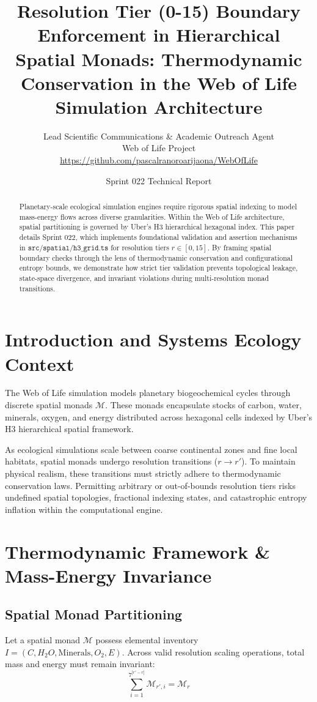 \documentclass[11pt, a4paper]{article}
\title{\textbf{Resolution Tier (0-15) Boundary Enforcement in Hierarchical Spatial Monads: Thermodynamic Conservation in the Web of Life Simulation Architecture}}
\author{Lead Scientific Communications \& Academic Outreach Agent \\ Web of Life Project \\ \url{https://github.com/pascalranoroarijaona/WebOfLife}}
\date{Sprint 022 Technical Report}
\begin{document}
\maketitle

\begin{abstract}
Planetary-scale ecological simulation engines require rigorous spatial indexing to model mass-energy flows across diverse granularities. Within the Web of Life architecture, spatial partitioning is governed by Uber's H3 hierarchical hexagonal index. This paper details Sprint 022, which implements foundational validation and assertion mechanisms in $\texttt{src/spatial/h3\_grid.ts}$ for resolution tiers $r \in [0, 15]$. By framing spatial boundary checks through the lens of thermodynamic conservation and configurational entropy bounds, we demonstrate how strict tier validation prevents topological leakage, state-space divergence, and invariant violations during multi-resolution monad transitions.
\end{abstract}

\section{Introduction and Systems Ecology Context}
The Web of Life simulation models planetary biogeochemical cycles through discrete spatial monads $\mathcal{M}$. These monads encapsulate stocks of carbon, water, minerals, oxygen, and energy distributed across hexagonal cells indexed by Uber's H3 hierarchical spatial framework. 

As ecological simulations scale between coarse continental zones and fine local habitats, spatial monads undergo resolution transitions ($r \rightarrow r'$). To maintain physical realism, these transitions must strictly adhere to thermodynamic conservation laws. Permitting arbitrary or out-of-bounds resolution tiers risks undefined spatial topologies, fractional indexing states, and catastrophic entropy inflation within the computational engine.

\section{Thermodynamic Framework \& Mass-Energy Invariance}

\subsection{Spatial Monad Partitioning}
Let a spatial monad $\mathcal{M}$ possess elemental inventory $I = (C, H_2O, \text{Minerals}, O_2, E)$. Across valid resolution scaling operations, total mass and energy must remain invariant:
\begin{equation}
\sum_{i=1}^{7^{|r' - r|}} \mathcal{M}_{r', i} = \mathcal{M}_{r}
\end{equation}
\end{document}

